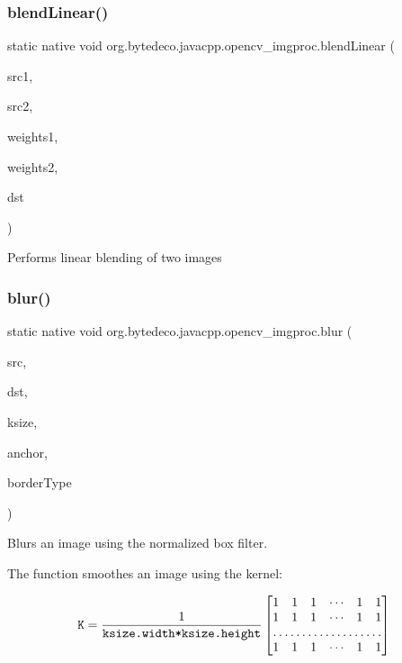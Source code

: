 \subsubsection{\texorpdfstring{blend\+Linear()}{blendLinear()}}
{\footnotesize\ttfamily static native void org.\+bytedeco.\+javacpp.\+opencv\+\_\+imgproc.\+blend\+Linear (\begin{DoxyParamCaption}\item[{@By\+Val Mat}]{src1,  }\item[{@By\+Val Mat}]{src2,  }\item[{@By\+Val Mat}]{weights1,  }\item[{@By\+Val Mat}]{weights2,  }\item[{@By\+Val Mat}]{dst }\end{DoxyParamCaption})\hspace{0.3cm}{\ttfamily [static]}}

Performs linear blending of two images \mbox{\label{group__imgproc__filter_ga2878e087c0294ad9e5f1996c07b303b4}} 
\subsubsection{\texorpdfstring{blur()}{blur()}}
{\footnotesize\ttfamily static native void org.\+bytedeco.\+javacpp.\+opencv\+\_\+imgproc.\+blur (\begin{DoxyParamCaption}\item[{@By\+Val Mat}]{src,  }\item[{@By\+Val Mat}]{dst,  }\item[{@By\+Val Size}]{ksize,  }\item[{@By\+Val(null\+Value=\char`\"{}cv\+::\+fr.antproject.utils.Point(-\/1,-\/1)\char`\"{}) fr.antproject.utils.Point}]{anchor,  }\item[{int}]{border\+Type }\end{DoxyParamCaption})\hspace{0.3cm}{\ttfamily [static]}}



Blurs an image using the normalized box filter. 

The function smoothes an image using the kernel\+: 

\[\texttt{K} = \frac{1}{\texttt{ksize.width*ksize.height}} \begin{bmatrix} 1 & 1 & 1 & \cdots & 1 & 1 \\ 1 & 1 & 1 & \cdots & 1 & 1 \\ \hdotsfor{6} \\ 1 & 1 & 1 & \cdots & 1 & 1 \\ \end{bmatrix}\] 

